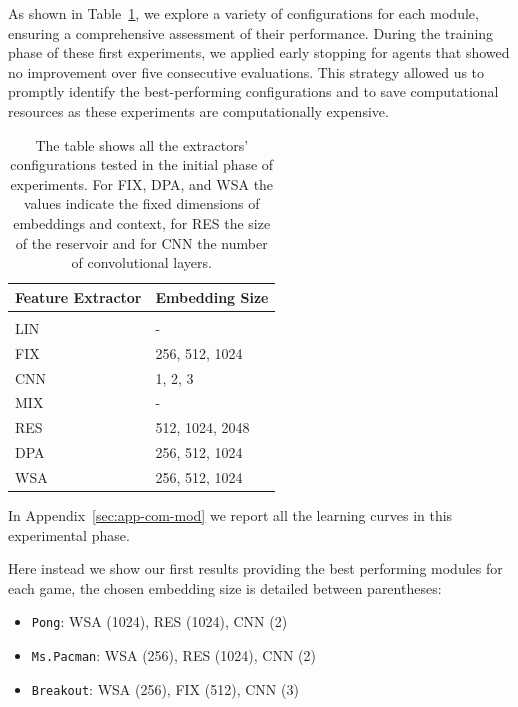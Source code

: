 As shown in Table~\ref{tab:emb_siz_modules}, we explore a variety of configurations for each module, ensuring a comprehensive assessment of their performance.
During the training phase of these first experiments, we applied early stopping for agents that showed no improvement over five consecutive evaluations.
This strategy allowed us to promptly identify the best-performing configurations and to save computational resources as these experiments are computationally expensive.


\begin{table}[ht]
    \begin{center}
        \begin{tabular}{ll}
            \multicolumn{1}{l}{\bf Feature Extractor}  &\multicolumn{1}{l}{\bf Embedding Size}
            \\ \hline \\
            LIN              &  - \\
            FIX        & 256, 512, 1024 \\
            CNN       & 1, 2, 3\\
            MIX                             & - \\
            RES           & 512, 1024, 2048 \\
            DPA             & 256, 512, 1024 \\
            WSA         & 256, 512, 1024 \\

        \end{tabular}
    \end{center}
    \caption{The table shows all the extractors' configurations tested in the initial phase of experiments. For FIX, DPA, and WSA the values indicate the fixed dimensions of embeddings and context, for RES the size of the reservoir and for CNN the number of convolutional layers.}
    \label{tab:emb_siz_modules}
\end{table}

In Appendix~\ref{sec:app-com-mod} we report all the learning curves in this experimental phase.

Here instead we show our first results providing the best performing modules for each game, the chosen embedding size is detailed between parentheses:
\begin{itemize}
    \item \texttt{Pong}: WSA (1024), RES (1024), CNN (2)
    \item \texttt{Ms.Pacman}: WSA (256), RES (1024), CNN (2)
    \item \texttt{Breakout}: WSA (256), FIX (512), CNN (3)
\end{itemize}

